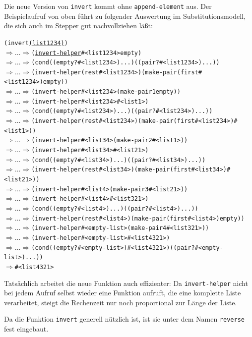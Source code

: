 Die neue Version von \texttt{invert} kommt ohne
\texttt{append-element} aus.  Der Beispielaufruf von oben führt zu
folgender Auswertung im Substitutionsmodell, die sich auch im Stepper
gut nachvollziehen läßt:
%
\begin{alltt}\small
(invert \underline{(list 1 2 3 4)})
\(\Longrightarrow\ldots\Longrightarrow\) (\underline{invert-helper} #<list 1 2 3 4> empty)
\(\Longrightarrow\ldots\Longrightarrow\) (cond ((empty? #<list 1 2 3 4>) ...) ((pair? #<list 1 2 3 4>) ...))
\(\Longrightarrow\ldots\Longrightarrow\) (invert-helper (rest #<list 1 2 3 4>) (make-pair (first #<list 1 2 3 4>) empty))
\(\Longrightarrow\ldots\Longrightarrow\) (invert-helper #<list 2 3 4> (make-pair 1 empty))
\(\Longrightarrow\ldots\Longrightarrow\) (invert-helper #<list 2 3 4> #<list 1>)
\(\Longrightarrow\ldots\Longrightarrow\) (cond ((empty? #<list 2 3 4>) ...) ((pair? #<list 2 3 4>) ...))
\(\Longrightarrow\ldots\Longrightarrow\) (invert-helper (rest #<list 2 3 4>) (make-pair (first #<list 2 3 4>) #<list 1>))
\(\Longrightarrow\ldots\Longrightarrow\) (invert-helper #<list 3 4> (make-pair 2 #<list 1>))
\(\Longrightarrow\ldots\Longrightarrow\) (invert-helper #<list 3 4> #<list 2 1>)
\(\Longrightarrow\ldots\Longrightarrow\) (cond ((empty? #<list 3 4>) ...) ((pair? #<list 3 4>) ...))
\(\Longrightarrow\ldots\Longrightarrow\) (invert-helper (rest #<list 3 4>) (make-pair (first #<list 3 4>) #<list 2 1>))
\(\Longrightarrow\ldots\Longrightarrow\) (invert-helper #<list 4> (make-pair 3 #<list 2 1>))
\(\Longrightarrow\ldots\Longrightarrow\) (invert-helper #<list 4> #<list 3 2 1>)
\(\Longrightarrow\ldots\Longrightarrow\) (cond ((empty? #<list 4>) ...) ((pair? #<list 4>) ...))
\(\Longrightarrow\ldots\Longrightarrow\) (invert-helper (rest #<list 4>) (make-pair (first #<list 4>) empty))
\(\Longrightarrow\ldots\Longrightarrow\) (invert-helper #<empty-list> (make-pair 4 #<list 3 2 1>))
\(\Longrightarrow\ldots\Longrightarrow\) (invert-helper #<empty-list> #<list 4 3 2 1>)
\(\Longrightarrow\ldots\Longrightarrow\) (cond ((empty? #<empty-list>) #<list 4 3 2 1>) ((pair? #<empty-list>) ...))
\(\Longrightarrow\) #<list 4 3 2 1>
\end{alltt}
%
Tatsächlich arbeitet die neue Funktion auch effizienter: Da
\texttt{invert-helper} nicht bei jedem Aufruf selbst wieder eine Funktion
aufruft, die eine komplette Liste verarbeitet, steigt die Rechenzeit
nur noch proportional zur Länge der Liste.

Da die Funktion \texttt{invert} generell nützlich ist, ist sie unter
dem Namen \texttt{reverse} fest eingebaut.

